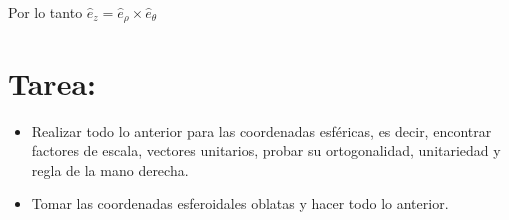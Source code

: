 Por lo tanto $\hat{e}_{z}=\hat{e}_{\rho} \times \hat{e}_{\theta}$

\section{Tarea:}
\begin{itemize}
  \item Realizar todo lo anterior para las coordenadas esféricas, es decir, encontrar factores de escala, vectores unitarios, probar su ortogonalidad, unitariedad y regla de la mano derecha.

  \item Tomar las coordenadas esferoidales oblatas y hacer todo lo anterior.

\end{itemize}
